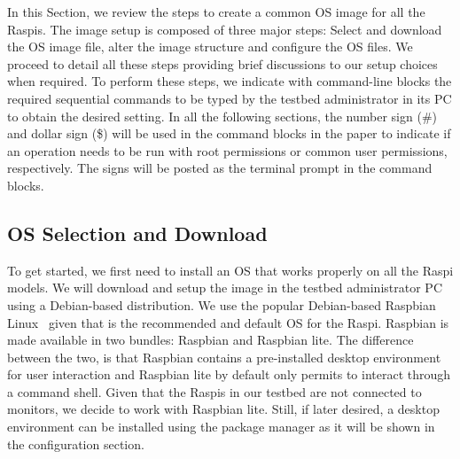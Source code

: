 \label{sec:image_setup}
In this Section, we review the steps to create a common \ac{OS} image for
all the \ac{Raspi}s. The image setup is composed of three major steps:
Select and download the \ac{OS} image file, alter the image structure and
configure the \ac{OS} files. We proceed to detail all these steps providing
brief discussions to our setup choices when required. To perform these
steps, we indicate with command-line blocks the required sequential
commands to be typed by the testbed administrator in its \ac{PC} to obtain
the desired setting. In all the following sections, the number sign
(\#) and dollar sign (\$) will be used in the command blocks in the paper
to indicate if an operation needs to be run with root permissions or
common user permissions, respectively. The signs will be posted as the
terminal prompt in the command blocks.

\subsection{OS Selection and Download}

To get started, we first need to install an \ac{OS} that works properly
on all the \ac{Raspi} models. We will download and setup the image in
the testbed administrator \ac{PC} using a Debian-based distribution. We
use the popular Debian-based Raspbian Linux~\cite{raspbian} given that is
the recommended and default \ac{OS} for the \ac{Raspi}. Raspbian is made
available in two bundles: Raspbian and Raspbian lite. The difference
between the two, is that Raspbian contains a pre-installed desktop environment
for user interaction and Raspbian lite by default only permits to interact
through a command shell. Given that the \ac{Raspi}s in our testbed are not
connected to monitors, we decide to work with Raspbian lite. Still, if later
desired, a desktop environment can be installed using the package manager
as it will be shown in the configuration section.


